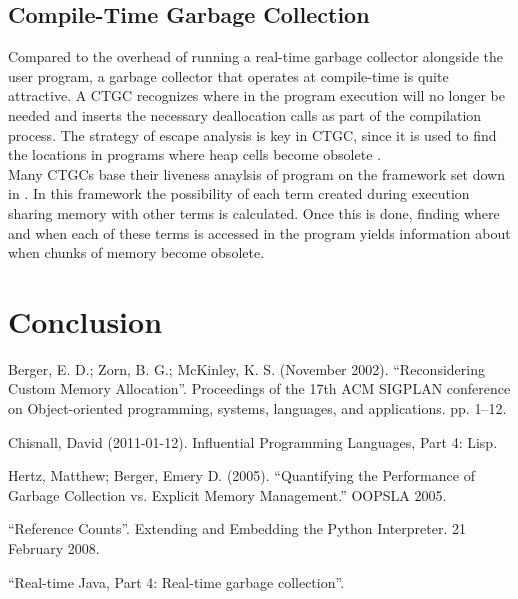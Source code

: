 \documentclass[12pt]{article}
\begin{document}
\subsection{Compile-Time Garbage Collection}

Compared to the overhead of running a real-time garbage collector alongside the user program, a garbage collector that operates at compile-time is quite attractive. A CTGC recognizes where in the program execution will no longer be needed and inserts the necessary deallocation calls as part of the compilation process. The strategy of escape analysis is key in CTGC, since it is used to find the locations in programs where heap cells become obsolete \cite{mercury}. \\

Many CTGCs base their liveness anaylsis of program on the framework set down in \cite{bruynooghe}. In this framework the possibility of each term created during execution sharing memory with other terms is calculated. Once this is done, finding where and when each of these terms is accessed in the program yields information about when chunks of memory become obsolete. 


\section{Conclusion}
\newpage
\begin{thebibliography}{}
  Berger, E. D.; Zorn, B. G.; McKinley, K. S. (November 2002). ``Reconsidering Custom Memory Allocation''. Proceedings of the 17th ACM SIGPLAN conference on Object-oriented programming, systems, languages, and applications. pp. 1–12.

  Chisnall, David (2011-01-12). Influential Programming Languages, Part 4: Lisp.
  
  Hertz, Matthew; Berger, Emery D. (2005). ``Quantifying the Performance of Garbage Collection vs. Explicit Memory Management.'' OOPSLA 2005.

  ``Reference Counts''. Extending and Embedding the Python Interpreter. 21 February 2008.

  ``Real-time Java, Part 4: Real-time garbage collection''.

\end{thebibliography}
\end{document}
